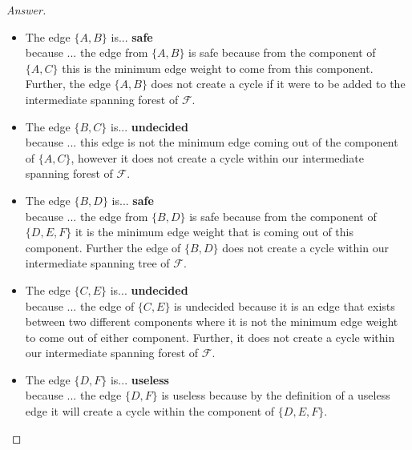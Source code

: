 \documentclass[11pt]{article}
\theoremstyle{definition}
\theoremstyle{definition}
\theoremstyle{definition}
\begin{document}
\begin{proof}[Answer]
\begin{itemize}
\item The edge $\{A,B\}$ is... \textbf{safe} \\ %
because ... the edge from $\{A,B\}$ is safe because from the component of $\{A,C\}$ this is the minimum edge weight to come from this component. Further, the edge $\{A,B\}$ does not create a cycle if it were to be added to the intermediate spanning forest of $\mathcal{F}$.%
\item The edge $\{B,C\}$ is... \textbf{undecided} \\ %
because ... this edge is not the minimum edge coming out of the component of $\{A,C\}$, however it does not create a cycle within our intermediate spanning forest of $\mathcal{F}$. %
\item The edge $\{B, D\}$ is... \textbf{safe} \\%
because ... the edge from $\{B,D\}$ is safe because from the component of $\{D, E, F\}$ it is the minimum edge weight that is coming out of this component. Further the edge of $\{B,D\}$ does not create a cycle within our intermediate spanning tree of $\mathcal{F}$. %
\item The edge $\{C, E\}$ is... \textbf{undecided} \\ %
because ... the edge of $\{C,E\}$ is undecided because it is an edge that exists between two different components where it is not the minimum edge weight to come out of either component. Further, it does not create a cycle within our intermediate spanning forest of $\mathcal{F}$.%
\item The edge $\{D, F\}$ is... \textbf{useless} \\ %
because ... the edge $\{D, F\}$ is useless because by the definition of a useless edge it will create a cycle within the component of $\{D, E, F\}$.%
\end{itemize}
\end{proof}




\end{document}
